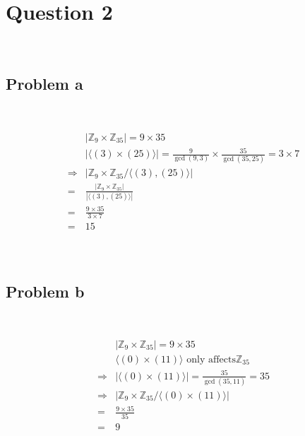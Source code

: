 \documentclass{article}
\begin{document}
\newpage

\section*{Question 2}

~

\subsection*{Problem a}

~

\begin{equation*}
    \begin{split}
        &|\mathbb{Z} _9\times\mathbb{Z} _{35}|=9\times 35\\
        &|\langle(3)\times(25)\rangle|=\frac{9}{\gcd(9,3)}\times\frac{35}{\gcd(35,25)}=3\times 7\\
        \Rightarrow&|\mathbb{Z} _9\times\mathbb{Z} _{35}/\langle(3),(25)\rangle|\\
        =&\frac{|\mathbb{Z} _9\times\mathbb{Z} _{35}|}{|\langle(3),(25)\rangle|}\\
        =&\frac{9\times 35}{3\times 7}\\
        =&15\\
    \end{split}
\end{equation*}

~

\subsection*{Problem b}

~

\begin{equation*}
    \begin{split}
        &|\mathbb{Z} _9\times\mathbb{Z} _{35}|=9\times 35\\
        &\langle(0)\times(11)\rangle\text{ only affects}\mathbb{Z} _{35}\\
        \Rightarrow&|\langle(0)\times(11)\rangle|=\frac{35}{\gcd(35,11)}=35\\
        \Rightarrow&|\mathbb{Z} _9\times\mathbb{Z} _{35}/\langle(0)\times(11)\rangle|\\
        =&\frac{9\times 35}{35}\\
        =&9\\
    \end{split}
\end{equation*}
\end{document}
